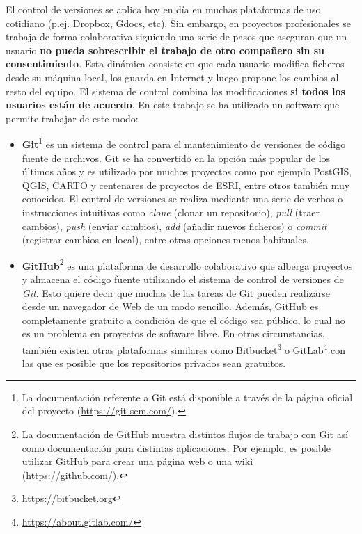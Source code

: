 El control de versiones se aplica hoy en día en muchas plataformas de uso cotidiano (p.ej. Dropbox, Gdocs, etc). Sin embargo, en proyectos profesionales se trabaja de forma colaborativa siguiendo una serie de pasos que aseguran que un usuario \textbf{no pueda sobrescribir el trabajo de otro compañero sin su consentimiento}. Esta dinámica consiste en que cada usuario modifica ficheros desde su máquina local, los guarda en Internet y luego propone los cambios al resto del equipo. El sistema de control combina las modificaciones \textbf{si todos los usuarios están de acuerdo}. En este trabajo se ha utilizado un software que permite trabajar de este modo:

\begin{itemize}
\item\textbf{Git}\footnote{La documentación referente a Git está disponible a través de la página oficial del proyecto (\url{https://git-scm.com/}).} es un sistema de control para el mantenimiento de versiones de código fuente de archivos. Git se ha convertido en la opción más popular de los últimos años y es utilizado por muchos proyectos como por ejemplo PostGIS, QGIS, CARTO y centenares de proyectos de ESRI, entre otros también muy conocidos. El control de versiones se realiza mediante una serie de verbos o instrucciones intuitivas como \textit{clone} (clonar un repositorio), \textit{pull} (traer cambios), \textit{push} (enviar cambios), \textit{add} (añadir nuevos ficheros) o \textit{commit} (registrar cambios en local), entre otras opciones menos habituales.
\item\textbf{GitHub}\footnote{La documentación de GitHub muestra distintos flujos de trabajo con Git así como documentación para distintas aplicaciones. Por ejemplo, es posible utilizar GitHub para crear una página web o una wiki (\url{https://github.com/}).} es una plataforma de desarrollo colaborativo que alberga proyectos y almacena el código fuente utilizando el sistema de control de versiones de \textit{Git}. Esto quiere decir que muchas de las tareas de Git pueden realizarse desde un navegador de Web de un modo sencillo. Además, GitHub es completamente gratuito a condición de que el código sea público, lo cual no es un problema en proyectos de software libre. En otras circunstancias, también existen otras plataformas similares como Bitbucket\footnote{\url{https://bitbucket.org}} o GitLab\footnote{\url{https://about.gitlab.com/}} con las que es posible que los repositorios privados sean gratuitos.
\end{itemize}

